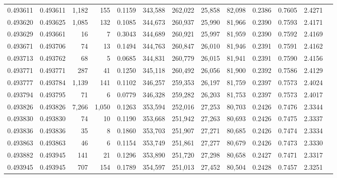 \begin{tabular}{rrrrrrrrrrrrr}
0.493611 & 0.493611 & 1,182 &   155 &                                     0.1159 & 343,588 & 262,022 &  25,858 &  82,098 & 0.2386 & 0.7605 & 2.4271 \\
0.493620 & 0.493625 & 1,085 &   132 &                                     0.1085 & 344,673 & 260,937 &  25,990 &  81,966 & 0.2390 & 0.7593 & 2.4171 \\
0.493629 & 0.493661 &    16 &     7 &                                     0.3043 & 344,689 & 260,921 &  25,997 &  81,959 & 0.2390 & 0.7592 & 2.4169 \\
0.493671 & 0.493706 &    74 &    13 &                                     0.1494 & 344,763 & 260,847 &  26,010 &  81,946 & 0.2391 & 0.7591 & 2.4162 \\
0.493713 & 0.493762 &    68 &     5 &                                     0.0685 & 344,831 & 260,779 &  26,015 &  81,941 & 0.2391 & 0.7590 & 2.4156 \\
0.493771 & 0.493771 &   287 &    41 &                                     0.1250 & 345,118 & 260,492 &  26,056 &  81,900 & 0.2392 & 0.7586 & 2.4129 \\
0.493777 & 0.493784 & 1,139 &   141 &                                     0.1102 & 346,257 & 259,353 &  26,197 &  81,759 & 0.2397 & 0.7573 & 2.4024 \\
0.493794 & 0.493795 &    71 &     6 &                                     0.0779 & 346,328 & 259,282 &  26,203 &  81,753 & 0.2397 & 0.7573 & 2.4017 \\
0.493826 & 0.493826 & 7,266 & 1,050 &                                     0.1263 & 353,594 & 252,016 &  27,253 &  80,703 & 0.2426 & 0.7476 & 2.3344 \\
0.493830 & 0.493830 &    74 &    10 &                                     0.1190 & 353,668 & 251,942 &  27,263 &  80,693 & 0.2426 & 0.7475 & 2.3337 \\
0.493836 & 0.493836 &    35 &     8 &                                     0.1860 & 353,703 & 251,907 &  27,271 &  80,685 & 0.2426 & 0.7474 & 2.3334 \\
0.493863 & 0.493863 &    46 &     6 &                                     0.1154 & 353,749 & 251,861 &  27,277 &  80,679 & 0.2426 & 0.7473 & 2.3330 \\
0.493882 & 0.493945 &   141 &    21 &                                     0.1296 & 353,890 & 251,720 &  27,298 &  80,658 & 0.2427 & 0.7471 & 2.3317 \\
0.493945 & 0.493945 &   707 &   154 &                                     0.1789 & 354,597 & 251,013 &  27,452 &  80,504 & 0.2428 & 0.7457 & 2.3251 \\

\end{tabular}
